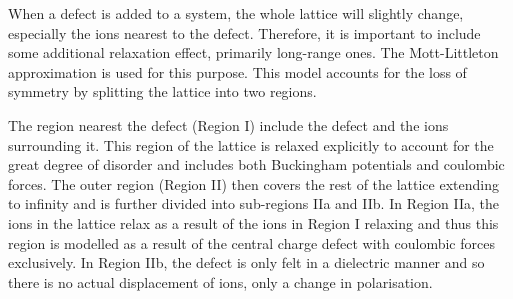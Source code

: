 \documentclass[10pt,a4paper, titlepage]{article}
\begin{document}
When a defect is added to a system, the whole lattice will slightly change, especially the ions nearest to the defect. 
Therefore, it is important to include some additional relaxation effect, primarily long-range ones. 
The Mott-Littleton approximation is used for this purpose. 
This model accounts for the loss of symmetry by splitting the lattice into two regions.  

The region nearest the defect (Region I) include the defect and the ions surrounding it. 
This region of the lattice is relaxed explicitly to account for the great degree of disorder and includes both Buckingham potentials and coulombic forces. 
The outer region (Region II) then covers the rest of the lattice extending to infinity and is further divided into sub-regions IIa and IIb. 
In Region IIa, the ions in the lattice relax as a result of the ions in Region I relaxing and thus this region is modelled as a result of the central charge defect with coulombic forces exclusively. 
In Region IIb, the defect is only felt in a dielectric manner and so there is no actual displacement of ions, only a change in polarisation. \cite{RN76}



\end{document}
